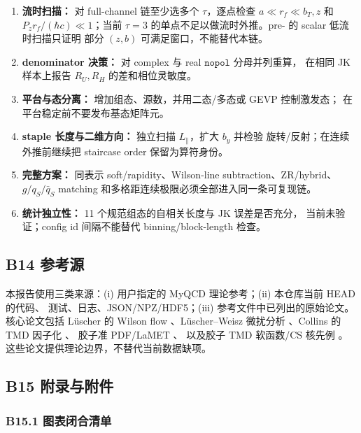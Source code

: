 \documentclass[UTF8]{ctexart}
\newcommand{\code}[1]{\texttt{\detokenize{#1}}}
\newcommand{\Pz}{P_z}
\begin{document}
\begin{warnbox}
\begin{enumerate}
  \item \textbf{流时扫描：} 对 full-channel 链至少选多个 \(\tau\)，逐点检查
        \(a\ll r_f\ll b_T,z\) 和 \(\Pz r_f/(\hbar c)\ll1\)；当前 \(\tau=3\)
        的单点不足以做流时外推。pre-\code{dev25} 的 scalar 低流时扫描只证明
        部分 \((z,b)\) 可满足窗口，不能替代本链。
  \item \textbf{denominator 决策：} 对 complex 与 real \(\texttt{nopol}\) 分母并列重算，
        在相同 JK 样本上报告 \(R_U,R_H\) 的差和相位灵敏度。
  \item \textbf{平台与态分离：} 增加组态、源数，并用二态/多态或 GEVP 控制激发态；
        在平台稳定前不要发布基态矩阵元。
  \item \textbf{staple 长度与二维方向：} 独立扫描 \(L_\parallel\)，扩大 \(b_y\) 并检验
        旋转/反射；在连续外推前继续把 staircase order 保留为算符身份。
  \item \textbf{完整方案：} 同表示 soft/rapidity、Wilson-line subtraction、ZR/hybrid、
        \(g/q_S/\bar q_S\) matching 和多格距连续极限必须全部进入同一条可复现链。
  \item \textbf{统计独立性：} 11 个规范组态的自相关长度与 JK 误差是否充分，
        当前未验证；config id 间隔不能替代 binning/block-length 检查。
\end{enumerate}
\end{warnbox}

\subsection{B14 参考源}

本报告使用三类来源：(i) 用户指定的 MyQCD 理论参考；(ii) 本仓库当前 HEAD 的代码、
测试、日志、JSON/NPZ/HDF5；(iii) 参考文件中已列出的原始论文。核心论文包括
Lüscher 的 Wilson flow \cite{Luscher2010}、Lüscher--Weisz 微扰分析
\cite{LuscherWeisz2011}、Collins 的 TMD 因子化 \cite{Collins2011}、
胶子准 PDF/LaMET \cite{Ji2013,Ji2014,JiReview2021,ZhangGluonLaMET2019,LiMaQiu2019}、
以及胶子 TMD 软函数/CS 核先例 \cite{ZhangSoft2020,ChuCS2022,ChuSoft2023}。
这些论文提供理论边界，不替代当前数据缺项。

\subsection{B15 附录与附件}

\subsubsection{B15.1 图表闭合清单}
\end{document}
